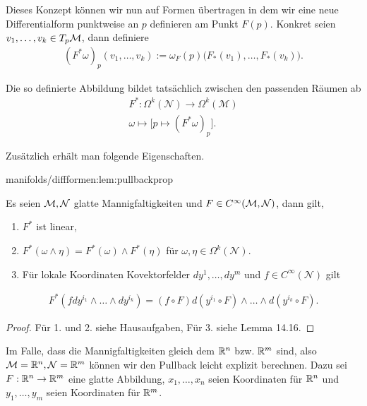 \par
Dieses Konzept können wir nun auf Formen übertragen in dem wir eine neue Differentialform punktweise an \(p\) definieren am Punkt \(F(p)\). Konkret seien \(v_1,\ldots, v_k\in T_p\mathcal{M}\), dann definiere
\begin{align*}
(F^\ast\omega)_p (v_1,\ldots,v_k) := \omega_F(p)\big(F_\ast(v_1),\ldots,F_\ast(v_k)\big).
\end{align*}
\par
Die so definierte Abbildung bildet tatsächlich zwischen den passenden Räumen ab
\begin{align*}
F^\ast:\Omega^k(\mathcal{N})\to\Omega^k(\mathcal{M})\\
\omega\mapsto \big[ p\mapsto (F^\ast\omega)_p \big].
\end{align*}
\par
Zusätzlich erhält man folgende Eigenschaften.
\begin{lemma}{}{manifolds/diffformen:lem:pullbackprop}



\par
Es seien \(\mathcal{M},\mathcal{N}\) glatte Mannigfaltigkeiten und \(F\in C^\infty(\mathcal{M},\mathcal{N})\), dann gilt,
\begin{enumerate}

\item {} 
\par
\(F^\ast\) ist linear,

\item {} 
\par
\(F^\ast(\omega\wedge\eta) = F^\ast(\omega) \wedge F^\ast(\eta)\) für \(\omega,\eta\in\Omega^k(\mathcal{N})\).

\item {} 
\par
Für lokale Koordinaten Kovektorfelder \(dy^1,\ldots,dy^m\) und \(f\in C^\infty(\mathcal{N})\) gilt

\end{enumerate}
\begin{align*}
F^\ast(f dy^{i_1}\wedge\ldots\wedge dy^{i_k}) = (f \circ F) d(y^{i_1}\circ F)\wedge\ldots\wedge d(y^{i_k}\circ F).
\end{align*}\end{lemma}

\begin{proof}
 Für 1. und 2. siehe Hausaufgaben, Für 3. siehe \cite{Lee03} Lemma 14.16.
\end{proof}

\par
Im Falle, dass die Mannigfaltigkeiten gleich dem \(\mathbb{R}^n\) bzw. \(\mathbb{R}^m\) sind, also \(\mathcal{M}=\mathbb{R}^n, \mathcal{N}=\mathbb{R}^m\) können wir den Pullback leicht explizit berechnen. Dazu sei \(F:\mathbb{R}^n\to\mathbb{R}^m\) eine glatte Abbildung, \(x_1,\ldots,x_n\) seien Koordinaten für \(\mathbb{R}^n\) und \(y_1,\ldots,y_m\) seien Koordinaten für \(\mathbb{R}^m\).

